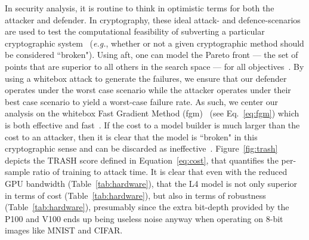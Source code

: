 \documentclass[sn-mathphys-num]{sn-jnl}%
\begin{document}
In security analysis, it is  routine to think in optimistic terms for both the attacker and defender. In cryptography, these ideal attack- and defence-scenarios are used to test the computational feasibility of subverting a particular cryptographic system~\cite{kamal2017study,leurent2020sha} (\textit{e.g.}, whether or not a given cryptographic method should be considered ``broken").
Using \acrshort{aft}, one can model the Pareto front --- the set of points that are superior to all others in the search space --- for all objectives~\cite{zitzler2008quality}. 
By using a whitebox attack to generate the failures, we ensure that our defender operates under the worst case scenario while the attacker operates under their best case scenario to yield a worst-case failure rate.
As such, we center our analysis on the whitebox Fast Gradient Method (\acrshort{fgm})~\cite{fgm} (see Eq.~\ref{eq:fgm}) which is both effective and fast~\cite{meyers}. 
If the cost to a model builder is much larger than the cost to an attacker, then it is  clear that the model is ``broken" in this cryptographic sense and can be discarded as ineffective~\cite{meyers_aft}. 
Figure~\ref{fig:trash} depicts the TRASH score defined in Equation~\ref{eq:cost}, that quantifies the per-sample ratio of training to attack time. 
It is clear that even with the reduced GPU bandwidth (Table~\ref{tab:hardware}), that the L4 model is not only superior in terms of cost (Table~\ref{tab:hardware}), but also in terms of robustness (Table~\ref{tab:hardware}), presumably since the extra bit-depth provided by the P100 and V100 ends up being useless noise anyway when operating on 8-bit images like MNIST and CIFAR.
\end{document}

